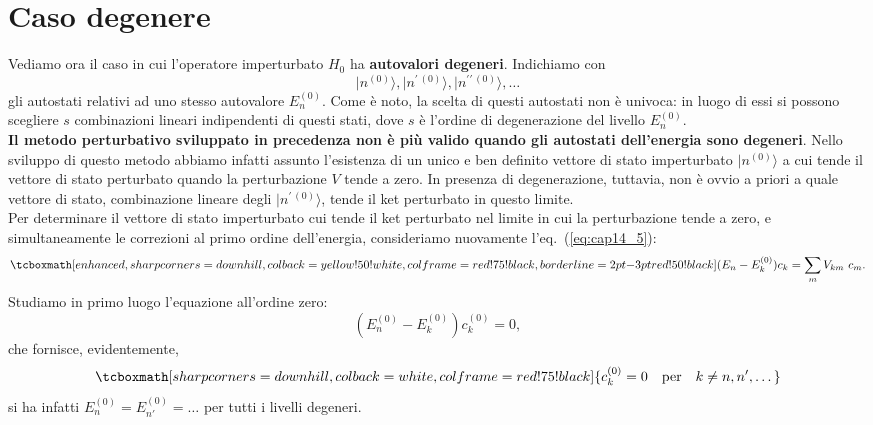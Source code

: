 \documentclass[a4paper,12pt,oneside]{book}
\begin{document}
\section{Caso degenere}
Vediamo ora il caso in cui l'operatore imperturbato $H_0$ ha \textbf{autovalori degeneri}. Indichiamo con
	\begin{equation}
		\vert n^{(0)} \rangle, \vert n^{\prime \,(0)} \rangle, \vert n^{\prime \prime \,(0)} \rangle, \dots
	\end{equation}
gli autostati relativi ad uno stesso autovalore $E_n ^{(0)}$. Come è noto, la scelta di questi autostati non è univoca: in luogo di essi si possono scegliere $s$ combinazioni lineari indipendenti di questi stati, dove $s$ è l'ordine di degenerazione del livello $E_n ^{(0)}$.\\

\textbf{Il metodo perturbativo sviluppato in precedenza non è più valido quando gli autostati dell'energia sono degeneri}. Nello sviluppo di questo metodo abbiamo infatti assunto l'esistenza di un unico e ben definito vettore di stato imperturbato $\vert n ^{(0)}\rangle$ a cui tende il vettore di stato perturbato quando la perturbazione $V$ tende a zero. In presenza di degenerazione, tuttavia, non è ovvio a priori a quale vettore di stato, combinazione lineare degli $\vert n^{\prime \,(0)}\rangle$, tende il ket perturbato in questo limite.\\

Per determinare il vettore di stato imperturbato cui tende il ket perturbato nel limite in cui la perturbazione tende a zero, e simultaneamente le correzioni al primo ordine dell'energia, consideriamo nuovamente l'eq.~(\ref{eq:cap14_5}):
	\begin{equation}
		\tcboxmath[enhanced, sharp corners=downhill, colback=yellow!50!white, colframe=red!75!black, borderline={2pt}{-3pt}{red!50!black}]{
			(E_n - E_k ^{(0)}) c_k = \sum _m V_{km}\ c_m.
			}
	\end{equation}
Studiamo in primo luogo l'equazione all'ordine zero:
	\begin{equation}
		\left( E_n ^{(0)} - E_k ^{(0)} \right) c_ k ^{(0)} =0,
	\end{equation}
che fornisce, evidentemente,
	\begin{equation}
		\tcboxmath[sharp corners=downhill, colback=white, colframe=red!75!black]{
			c_k ^{(0)} =0\quad \textrm{per} \quad k \neq n, n',\dots
			}
	\end{equation}
si ha infatti $E_n ^{(0)} = E_{n'} ^{(0)} = \dots $ per tutti i livelli degeneri.\\
\end{document}
